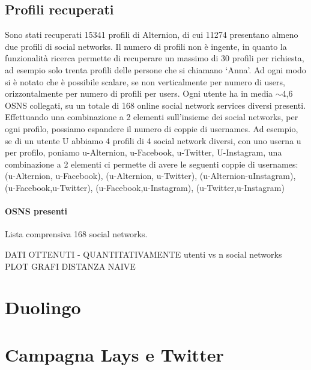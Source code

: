 \subsection{Profili recuperati}
Sono stati recuperati 15341 profili di Alternion, di cui 11274 presentano almeno due profili di social networks. Il numero di profili non è ingente, in quanto la funzionalità ricerca permette di recuperare un massimo di 30 profili per richiesta, ad esempio solo trenta profili delle persone che si chiamano `Anna'. Ad ogni modo si è notato che è possibile scalare, se non verticalmente per numero di users, orizzontalmente per numero di profili per users. Ogni utente ha in media $\sim$4,6 OSNS collegati, su un totale di 168 online social network services diversi presenti. Effettuando una combinazione a 2 elementi sull'insieme dei social networks, per ogni profilo, possiamo espandere il numero di coppie di usernames.
Ad esempio, se di un utente U abbiamo 4 profili di 4 social network diversi, con uno userna u per profilo, poniamo
{u-Alternion, u-Facebook, u-Twitter, U-Instagram}, una combinazione a 2 elementi ci permette di avere le seguenti coppie di usernames:
(u-Alternion, u-Facebook), (u-Alternion, u-Twitter), (u-Alternion-uInstagram), (u-Facebook,u-Twitter), (u-Facebook,u-Instagram), (u-Twitter,u-Instagram)

\paragraph{OSNS presenti}
Lista comprensiva 168 social networks.



DATI OTTENUTI - QUANTITATIVAMENTE utenti vs n social networks
PLOT GRAFI DISTANZA NAIVE

\section{Duolingo}
\section{Campagna Lays e Twitter}
